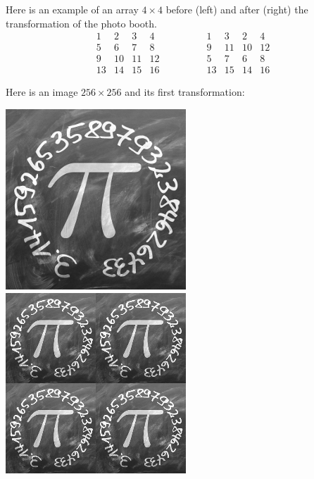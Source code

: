 \documentclass[11pt,class=report,crop=false]{standalone}
\begin{document}
\begin{cours}
Here is an example of an array $4\times 4$ before (left) and after (right) the transformation of the photo booth. 
$$\begin{array}{cccc} 
  1& 2& 3& 4\\ 
  5& 6& 7& 8\\  
  9&10&11&12\\  
 13&14&15&16  
\end{array}\qquad\qquad  
\begin{array}{cccc} 
  1& 3& 2& 4\\  
  9&11&10&12\\  
  5& 7& 6& 8\\  
 13&15&14&16
\end{array}$$

Here is an image $256 \times 256$ and its first transformation:

\begin{center}
\includegraphics[scale=\myscale,scale=0.4]{images_chapter/pi_gimp_new_photo_0.png}\qquad\qquad
\includegraphics[scale=\myscale,scale=0.4]{images_chapter/pi_gimp_new_photo_1.png}
\end{center}


\end{cours}
\end{document}
